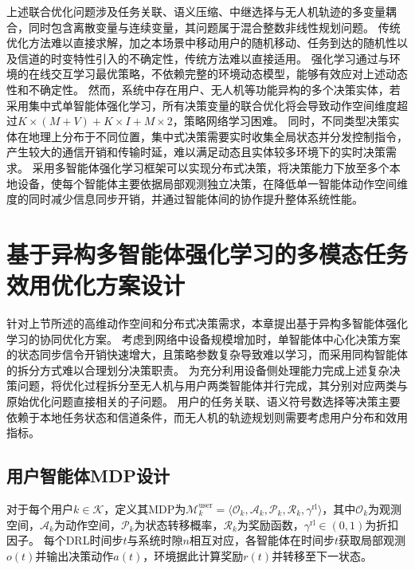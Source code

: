 上述联合优化问题涉及任务关联、语义压缩、中继选择与无人机轨迹的多变量耦合，同时包含离散变量与连续变量，其问题属于混合整数非线性规划问题。
传统优化方法难以直接求解，加之本场景中移动用户的随机移动、任务到达的随机性以及信道的时变特性引入的不确定性，传统方法难以直接适用。
强化学习通过与环境的在线交互学习最优策略，不依赖完整的环境动态模型，能够有效应对上述动态性和不确定性。
然而，系统中存在用户、无人机等功能异构的多个决策实体，若采用集中式单智能体强化学习，所有决策变量的联合优化将会导致动作空间维度超过$K \times (M+V) + K \times I + M \times 2$，策略网络学习困难。
同时，不同类型决策实体在地理上分布于不同位置，集中式决策需要实时收集全局状态并分发控制指令，产生较大的通信开销和传输时延，难以满足动态且实体较多环境下的实时决策需求。
采用多智能体强化学习框架可以实现分布式决策，将决策能力下放至多个本地设备，使每个智能体主要依据局部观测独立决策，在降低单一智能体动作空间维度的同时减少信息同步开销，并通过智能体间的协作提升整体系统性能。


\section{基于异构多智能体强化学习的多模态任务效用优化方案设计}

针对上节所述的高维动作空间和分布式决策需求，本章提出基于异构多智能体强化学习的协同优化方案。
考虑到网络中设备规模增加时，单智能体中心化决策方案的状态同步信令开销快速增大，且策略参数复杂导致难以学习，而采用同构智能体的拆分方式难以合理划分决策职责。
为充分利用设备侧处理能力完成上述复杂决策问题，将优化过程拆分至无人机与用户两类智能体并行完成，其分别对应两类与原始优化问题直接相关的子问题。
用户的任务关联、语义符号数选择等决策主要依赖于本地任务状态和信道条件，而无人机的轨迹规划则需要考虑用户分布和效用指标。

\subsection{用户智能体MDP设计}
对于每个用户$k \in \mathcal{K}$，定义其MDP为$\mathcal{M}_k^{\text{user}} = \langle \mathcal{O}_k, \mathcal{A}_k, \mathcal{P}_k, \mathcal{R}_k, \gamma^{\text{rl}} \rangle$，其中$\mathcal{O}_k$为观测空间，$\mathcal{A}_k$为动作空间，$\mathcal{P}_k$为状态转移概率，$\mathcal{R}_k$为奖励函数，$\gamma^{\text{rl}}\in(0,1)$为折扣因子。
每个DRL时间步$t$与系统时隙$n$相互对应，各智能体在时间步$t$获取局部观测$o(t)$并输出决策动作$a(t)$，环境据此计算奖励$r(t)$并转移至下一状态。

